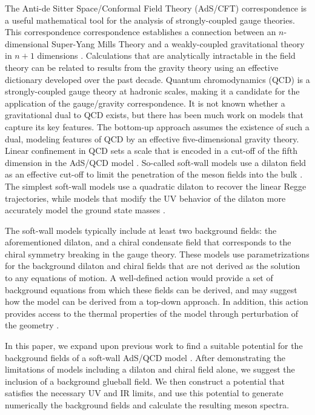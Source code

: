 \documentclass[aps,prd,12pt,nofootinbib]{revtex4}
\begin{document}
The Anti-de Sitter Space/Conformal Field Theory (AdS/CFT) correspondence is a useful mathematical tool for the analysis of strongly-coupled gauge theories.
This correspondence correspondence establishes a connection between an $n$-dimensional Super-Yang Mills Theory and a weakly-coupled gravitational theory in $n+1$ dimensions \cite{maldacena, Gubser1998, Witten:1998}. 
Calculations that are analytically intractable in the field theory can be related to results from the gravity theory using an effective dictionary developed over the past decade. 
Quantum chromodynamics (QCD) is a strongly-coupled gauge theory at hadronic scales, making it a candidate for the application of the gauge/gravity correspondence.
It is not known whether a gravitational dual to QCD exists, but there has been much work on models that capture its key features.
The bottom-up approach assumes the existence of such a dual, modeling features of QCD by an effective five-dimensional gravity theory.
Linear confinement in QCD sets a scale that is encoded in a cut-off of the fifth dimension in the AdS/QCD model \cite{stephanov-katz-son, DaRold2005}. 
So-called soft-wall models use a dilaton field as an effective cut-off to limit the penetration of the meson fields into the bulk \cite{karch-katz-son-adsqcd}. 
The simplest soft-wall models use a quadratic dilaton to recover the linear Regge trajectories, while models that modify the UV behavior of the dilaton more accurately model the ground state masses \cite{gherghetta-kelley, bartz-pions, Colangelo2008, Cui2013}.

The soft-wall models typically include at least two background fields: the aforementioned dilaton, and a chiral condensate field that corresponds to the chiral symmetry breaking in the gauge theory.
These models use parametrizations for the background dilaton and chiral fields that are not derived as the solution to any equations of motion. 
A well-defined action would provide a set of background equations from which these fields can be derived, and may suggest how the model can be derived from a top-down approach. 
In addition, this action provides access to the thermal properties of the model through perturbation of the geometry \cite{Herzog2007, Bayona2008, Gursoy2008b}.

In this paper, we expand upon previous work to find a suitable potential for the background fields of a soft-wall AdS/QCD model \cite{Batell2008, Springer2010, Gursoy2008a, Gursoy2008b, Csaki2007, Li2013, Li2013a, He2013}. 
After demonstrating the limitations of models including a dilaton and chiral field alone, we suggest the inclusion of a background glueball field. 
We then construct a potential that satisfies the necessary UV and IR limits, and use this potential to generate numerically the background fields and calculate the resulting meson spectra.
\end{document}
